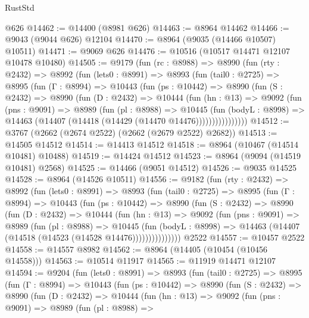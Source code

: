 \begin{lexlean}{RustStd}
\begin{coremodule}
    @626
@14462 := @14400 (@8981 @626)
@14463 := @8964 @14462
@14466 := @9043 (@9044 @626) @12104
@14470 := @8964 (@9035 (@14466 @10507) @10511)
@14471 := @9069 @626
@14476 := @10516 (@10517 @14471 @12107 @10478 @10480)
@14505 := @9179
    (fun (rc : @8988) =>
    @8990
      (fun (rty : @2432) =>
      @8992
        (fun (lets0 : @8991) =>
        @8993
          (fun (tail0 : @2725) =>
          @8995
            (fun (Γ : @8994) =>
            @10443
              (fun (ps : @10442) =>
              @8990
                (fun (S : @2432) =>
                @8990
                  (fun (D : @2432) =>
                  @10444
                    (fun (hn : @13) =>
                    @9092
                      (fun (pns : @9091) =>
                      @8989
                        (fun (pl : @8988) =>
                        @10445
                          (fun (bodyL : @8998) =>
                          @14463 (@14407 (@14418 (@14429 (@14470 @14476))))))))))))))))
@14512 := @3767 (@2662 (@2674 @2522) (@2662 (@2679 @2522) @2682))
@14513 := @14505 @14512
@14514 := @14413 @14512
@14518 := @8964 (@10467 (@14514 @10481) @10488)
@14519 := @14424 @14512
@14523 := @8964 (@9094 (@14519 @10481) @2568)
@14525 := @14466 (@9051 @14512)
@14526 := @9035 @14525
@14528 := @8964 (@14526 @10511)
@14556 := @9182
    (fun (rty : @2432) =>
    @8992
      (fun (lets0 : @8991) =>
      @8993
        (fun (tail0 : @2725) =>
        @8995
          (fun (Γ : @8994) =>
          @10443
            (fun (ps : @10442) =>
            @8990
              (fun (S : @2432) =>
              @8990
                (fun (D : @2432) =>
                @10444
                  (fun (hn : @13) =>
                  @9092
                    (fun (pns : @9091) =>
                    @8989
                      (fun (pl : @8988) =>
                      @10445
                        (fun (bodyL : @8998) =>
                        @14463 (@14407 (@14518 (@14523 (@14528 @14476)))))))))))))))
    @2522
@14557 := @10457 @2522
@14558 := @14557 @8982
@14562 := @8964 (@14405 (@10454 (@10456 @14558)))
@14563 := @10514 @11917
@14565 := @11919 @14471 @12107
@14594 := @9204
    (fun (lets0 : @8991) =>
    @8993
      (fun (tail0 : @2725) =>
      @8995
        (fun (Γ : @8994) =>
        @10443
          (fun (ps : @10442) =>
          @8990
            (fun (S : @2432) =>
            @8990
              (fun (D : @2432) =>
              @10444
                (fun (hn : @13) =>
                @9092
                  (fun (pns : @9091) =>
                  @8989
                    (fun (pl : @8988) =>

\end{coremodule}
\end{lexlean}

